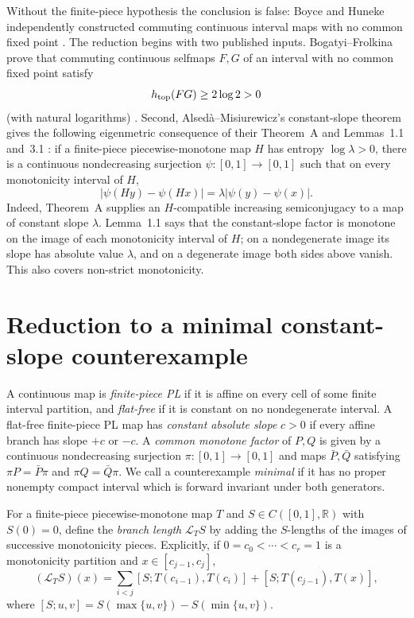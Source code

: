 \documentclass[11pt]{article}
\newcommand{\I}{[0,1]}
\begin{document}
Without the finite-piece hypothesis the conclusion is false: Boyce and Huneke independently constructed
commuting continuous interval maps with no common fixed point \cite{Boyce,Huneke}. The reduction begins
with two published inputs. Bogatyi--Frolkina prove that commuting continuous selfmaps
$F,G$ of an interval with no common fixed point satisfy
\begin{equation}\label{eq:BF}
h_{\rm top}(FG)\ge 2\log2>0
\end{equation}
(with natural logarithms) \cite[Theorem~1]{BogatyiFrolkina}. Second, Alsed\`a--Misiurewicz's constant-slope theorem gives the following eigenmetric consequence
of their Theorem~A and Lemmas~1.1 and~3.1 \cite[Theorem~A and Lemmas~1.1, 3.1]{AlsedaMisiurewicz}: if a
finite-piece piecewise-monotone map $H$ has entropy $\log\lambda>0$, there is a continuous
nondecreasing surjection $\psi:\I\to\I$ such that on every monotonicity interval of $H$,
\begin{equation}\label{eq:AM}
|\psi(Hy)-\psi(Hx)|=\lambda|\psi(y)-\psi(x)|.
\end{equation}
Indeed, Theorem~A supplies an $H$-compatible increasing semiconjugacy to a map of constant slope
$\lambda$. Lemma~1.1 says that the constant-slope factor is monotone on the image of each
monotonicity interval of $H$; on a nondegenerate image its slope has absolute value $\lambda$, and
on a degenerate image both sides above vanish. This also covers non-strict monotonicity.

\section{Reduction to a minimal constant-slope counterexample}

A continuous map is \emph{finite-piece PL} if it is affine on every cell of some finite interval partition, and
\emph{flat-free} if it is constant on no nondegenerate interval. A flat-free finite-piece PL map has
\emph{constant absolute slope} $c>0$ if every affine branch has slope $+c$ or $-c$. A
\emph{common monotone factor} of $P,Q$ is given by a continuous nondecreasing surjection
$\pi:\I\to\I$ and maps $\bar P,\bar Q$ satisfying
$\pi P=\bar P\pi$ and $\pi Q=\bar Q\pi$. We call a counterexample \emph{minimal} if it has no
proper nonempty compact interval which is forward invariant under both generators.

For a finite-piece piecewise-monotone map $T$ and $S\in C(\I,\mathbb R)$ with $S(0)=0$, define the
\emph{branch length} $\mathcal L_TS$ by adding the $S$-lengths of the images of successive
monotonicity pieces. Explicitly, if $0=c_0<\cdots<c_r=1$ is a monotonicity partition and
$x\in[c_{j-1},c_j]$,
\[
(\mathcal L_TS)(x)=\sum_{i<j}[S;T(c_{i-1}),T(c_i)]+[S;T(c_{j-1}),T(x)],
\]
where $[S;u,v]=S(\max\{u,v\})-S(\min\{u,v\})$.
\end{document}
